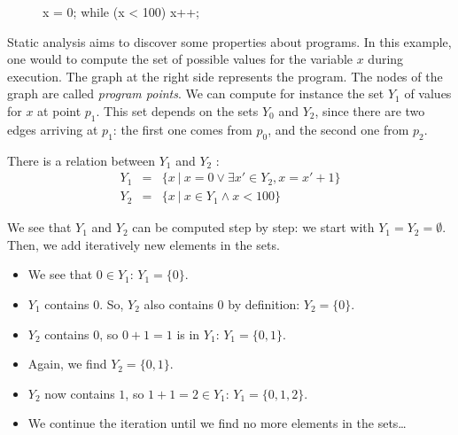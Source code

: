 \documentclass[a4paper,english,titlepage,11pt]{report}
\begin{document}
\begin{figure}[!h]
   \begin{minipage}[c]{.46\linewidth}
\begin{C}
x = 0;
while (x < 100) {
	x++;
}
\end{C}
   \end{minipage} \hfill
   \begin{minipage}[c]{.46\linewidth}
   \end{minipage}
\end{figure}
\FloatBarrier

Static analysis aims to discover some properties about programs. In this
example, one would to compute the set of possible values for the variable $x$
during execution.
The graph at the right side represents the program. The nodes of the graph are
called \emph{program points}. We can compute for instance the set $Y_1$ of
values for $x$ at point $p_1$. This set depends on the sets $Y_0$ and $Y_2$,
since there are two edges arriving at $p_1$: the first one comes from $p_0$, and
the second one from $p_2$.

There is a relation between $Y_1$ and $Y_2$ :
\begin{eqnarray*}
Y_1 &=& \{x\ |\ x=0 \vee \exists x' \in Y_2, x=x'+1 \} \\
Y_2 &=& \{x\ |\ x \in Y_1 \wedge x < 100 \}
\end{eqnarray*}

We see that $Y_1$ and $Y_2$ can be computed step by step:
we start with $Y_1 = Y_2 = \emptyset$.
Then, we add iteratively new elements in the sets.
\begin{itemize}
\item  We see that $0 \in Y_1$: $Y_1 = \{0\}$.
\item $Y_1$ contains $0$. So, $Y_2$ also contains $0$ by definition: $Y_2 =
\{0\}$.
\item $Y_2$ contains $0$, so $0+1=1$ is in $Y_1$: $Y_1 = \{0,1\}$.
\item Again, we find $Y_2 = \{0,1\}$.
\item $Y_2$ now contains $1$, so $1+1=2 \in Y_1$: $Y_1 = \{0,1,2\}$.
\item We continue the iteration until we find no more elements in the sets\dots
\end{itemize}
\end{document}
